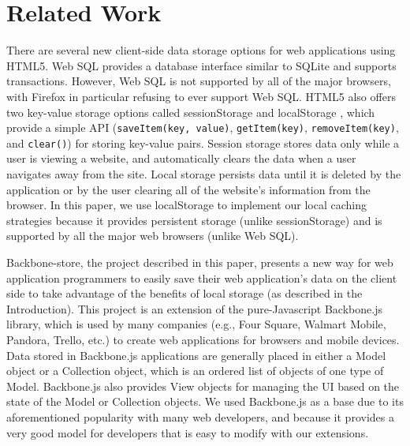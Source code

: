 \documentclass[12pt]{article}
\begin{document}
\section{Related Work}

There are several new client-side data storage options for web applications
using HTML5. Web SQL \cite{websql} provides a database interface similar to SQLite and supports
transactions. However, Web SQL is not supported by all of the major browsers,
with Firefox in particular refusing to ever support Web SQL. HTML5 also offers two key-value storage options called sessionStorage and localStorage \cite{localstorage}, which provide a simple API (\verb=saveItem(key, value)=, \verb=getItem(key)=,
\verb=removeItem(key)=, and \verb=clear()=) for storing key-value pairs. 
Session storage stores data only while a user is viewing a website, and
automatically clears the data when a user navigates away from the site. Local
storage persists data until it is deleted by the application or by the user
clearing all of the website's information from the browser. In this paper, we use localStorage to implement our local caching strategies because it provides persistent storage (unlike sessionStorage) and is supported by all the major web browsers (unlike Web SQL). 

Backbone-store, the project described in this paper, presents a new way for web
application programmers to easily save their web application's data on the
client side to take advantage of the benefits of local storage (as described in the Introduction). This project is an extension of the pure-Javascript Backbone.js \cite{backbone} library, which is used by many companies (e.g., Four Square, Walmart Mobile, Pandora, Trello, etc.) to create web applications for browsers and mobile devices. Data
stored in Backbone.js applications are generally placed in either a Model
object or a Collection object, which is an ordered list of objects of one type
of Model. Backbone.js also provides View objects for managing the UI based on
the state of the Model or Collection objects. We used Backbone.js as a base due
to its aforementioned popularity with many web developers, and because it
provides a very good model for developers that is easy to modify with our extensions.
\end{document}
